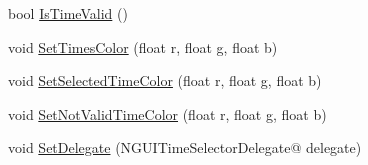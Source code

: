 \begin{DoxyCompactItemize}
\item 
bool \hyperlink{class_n_g_u_i_time_selector_ad5f53a4b684f8416c418af42bbe99ada}{Is\+Time\+Valid} ()
\item 
void \hyperlink{class_n_g_u_i_time_selector_a976f5e92f2f80aa5365c52f37143bd4a}{Set\+Times\+Color} (float r, float g, float b)
\item 
void \hyperlink{class_n_g_u_i_time_selector_aa24a1c2febab8eaa85f97bd22c95b615}{Set\+Selected\+Time\+Color} (float r, float g, float b)
\item 
void \hyperlink{class_n_g_u_i_time_selector_a5489b364a57baf683870b1d739702242}{Set\+Not\+Valid\+Time\+Color} (float r, float g, float b)
\item 
void \hyperlink{class_n_g_u_i_time_selector_a3efe55286a0b84083fda40c2a1faa042}{Set\+Delegate} (N\+G\+U\+I\+Time\+Selector\+Delegate@ delegate)
\end{DoxyCompactItemize}
